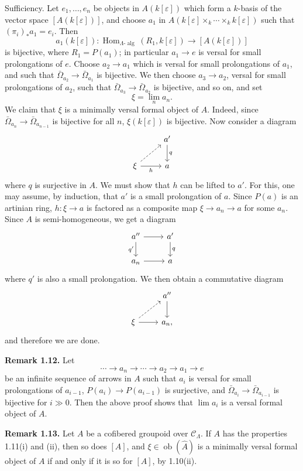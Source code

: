 \documentclass[11pt]{article}
\providecommand{\Hom}{\operatorname{Hom}}
\providecommand{\ob}{\operatorname{ob}}
\providecommand{\CL}{\mathcal C_\Lambda}
\providecommand{\alg}{\operatorname{alg}}
\begin{document}
Sufficiency. Let $e_1,\ldots,e_n$ be objects in $A(k[\varepsilon])$ which form a $k$-basis of the vector space $[A(k[\varepsilon])]$, and choose $a_1$ in $A(k[\varepsilon]\times_k\cdots\times_k k[\varepsilon])$ such that $(\pi_i)_*a_1=e_i$. Then
\[
 a_1(k[\varepsilon]):\Hom_{\Lambda\text{-}\alg}(R_1,k[\varepsilon])\longrightarrow [A(k[\varepsilon])]
\]
is bijective, where $R_1=P(a_1)$; in particular $a_1\to e$ is versal for small prolongations of $e$. Choose $a_2\to a_1$ which is versal for small prolongations of $a_1$, and such that $\bar\Omega_{a_2}\to\bar\Omega_{a_1}$ is bijective. We then choose $a_3\to a_2$, versal for small prolongations of $a_2$, such that $\bar\Omega_{a_3}\to\bar\Omega_{a_2}$ is bijective, and so on, and set
\[
 \xi=\lim_n a_n.
\]
We claim that $\xi$ is a minimally versal formal object of $A$. Indeed, since $\bar\Omega_{a_n}\to\bar\Omega_{a_{n-1}}$ is bijective for all $n$, $\xi(k[\varepsilon])$ is bijective. Now consider a diagram
\[
\begin{tikzcd}
& a' \arrow[d,"q"]\\
\xi \arrow[r,"h"'] \arrow[ur,dashed] & a
\end{tikzcd}
\]
where $q$ is surjective in $A$. We must show that $h$ can be lifted to $a'$. For this, one may assume, by induction, that $a'$ is a small prolongation of $a$. Since $P(a)$ is an artinian ring, $h:\xi\to a$ is factored as a composite map $\xi\to a_n\to a$ for some $a_n$. Since $A$ is semi-homogeneous, we get a diagram
\[
\begin{tikzcd}
 a'' \arrow[r] \arrow[d,"q'"'] & a' \arrow[d,"q"]\\
 a_n \arrow[r] & a
\end{tikzcd}
\]
where $q'$ is also a small prolongation. We then obtain a commutative diagram
\[
\begin{tikzcd}
& a'' \arrow[d]\\
\xi \arrow[r] \arrow[ur,dashed] & a_n,
\end{tikzcd}
\]
and therefore we are done.

\textbf{Remark 1.12.} Let
\[
 \cdots\longrightarrow a_n\longrightarrow\cdots\longrightarrow a_2\longrightarrow a_1\longrightarrow e
\]
be an infinite sequence of arrows in $A$ such that $a_i$ is versal for small prolongations of $a_{i-1}$, $P(a_i)\to P(a_{i-1})$ is surjective, and $\bar\Omega_{a_i}\to\bar\Omega_{a_{i-1}}$ is bijective for $i\gg0$. Then the above proof shows that $\lim a_i$ is a versal formal object of $A$.

\textbf{Remark 1.13.} Let $A$ be a cofibered groupoid over $\CL$. If $A$ has the properties 1.11(i) and (ii), then so does $[A]$, and $\xi\in\ob(\widehat A)$ is a minimally versal formal object of $A$ if and only if it is so for $[A]$, by 1.10(ii).
\end{document}
